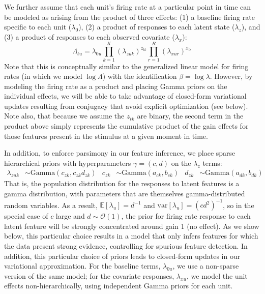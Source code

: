 \documentclass[10pt,letterpaper]{article}
\begin{document}
We further assume that each unit's firing rate at a particular point in time can be modeled as arising from the product of three effects: (1) a baseline firing rate specific to each unit ($\lambda_0$), (2) a product of responses to each latent state ($\lambda_z$), and (3) a product of responses to each observed covariate ($\lambda_x$):
\begin{equation}
    \label{fr_model}
    \Lambda_{tu} = \lambda_{0u} \prod_{k = 1}^K (\lambda_{zuk})^{z_{tk}}
    \prod_{r = 1}^R (\lambda_{xur})^{x_{tr}}
\end{equation}
Note that this is conceptually similar to the generalized linear model for firing rates (in which we model $\log \Lambda$) with the identification $\beta = \log \lambda$. However, by modeling the firing rate as a product and placing Gamma priors on the individual effects, we will be able to take advantage of closed-form variational updates resulting from conjugacy that avoid explicit optimization (see below). Note also, that because we assume the $z_{tk}$ are binary, the second term in the product above simply represents the cumulative product of the gain effects for those features present in the stimulus at a given moment in time.

In addition, to enforce parsimony in our feature inference, we place sparse hierarchical priors with hyperparameters $\gamma = (c, d)$ on the $\lambda_z$ terms:
\begin{align}
    \label{hierarchy}
    \lambda_{zuk} &\sim \text{Gamma}(c_{zk}, c_{zk} d_{zk}) & c_{zk} &\sim \text{Gamma}(a_{ck}, b_{ck})
    & d_{zk} &\sim \text{Gamma}(a_{dk}, b_{dk})
\end{align}
That is, the population distribution for the responses to latent features is a gamma distribution, with parameters that are themselves gamma-distributed random variables. As a result, $\mathbb{E}[\lambda_u] = d^{-1}$ and $\text{var}[\lambda_u] = (cd^2)^{-1}$, so in the special case of $c$ large and $d\sim \mathcal{O}(1)$, the prior for firing rate response to each latent feature will be strongly concentrated around gain 1 (no effect). As we show below, this particular choice results in a model that only infers features for which the data present strong evidence, controlling for spurious feature detection. In addition, this particular choice of priors leads to closed-form updates in our variational approximation. For the baseline terms, $\lambda_{0u}$, we use a non-sparse version of the same model; for the covariate responses, $\lambda_{xu}$, we model the unit effects non-hierarchically, using independent Gamma priors for each unit.
\end{document}
